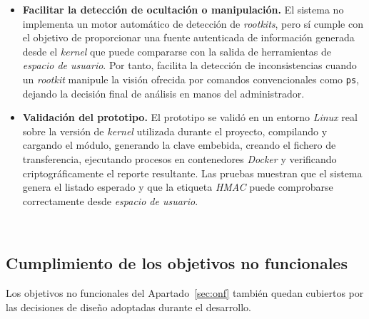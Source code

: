 \begin{itemize}
    \item \textbf{Facilitar la detección de ocultación o manipulación.} El sistema no implementa un motor automático de detección de \textit{rootkits}, pero sí cumple con el objetivo de proporcionar una fuente autenticada de información generada desde el \textit{kernel} que puede compararse con la salida de herramientas de \textit{espacio de usuario}. Por tanto, facilita la detección de inconsistencias cuando un \textit{rootkit} manipule la visión ofrecida por comandos convencionales como \texttt{ps}, dejando la decisión final de análisis en manos del administrador.
    
    \item \textbf{Validación del prototipo.} El prototipo se validó en un entorno \textit{Linux} real sobre la versión de \textit{kernel} utilizada durante el proyecto, compilando y cargando el módulo, generando la clave embebida, creando el fichero de transferencia, ejecutando procesos en contenedores \textit{Docker} y verificando criptográficamente el reporte resultante. Las pruebas muestran que el sistema genera el listado esperado y que la etiqueta \textit{HMAC} puede comprobarse correctamente desde \textit{espacio de usuario}.
\end{itemize}

\

\subsection{Cumplimiento de los objetivos no funcionales}

Los objetivos no funcionales del Apartado~\ref{sec:onf} también quedan cubiertos por las decisiones de diseño adoptadas durante el desarrollo.\\

